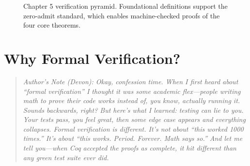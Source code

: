 

\begin{figure}[H]
\centering
{}
\caption{Chapter 5 verification pyramid. Foundational definitions support the zero-admit standard, which enables machine-checked proofs of the four core theorems.}
\label{fig:ch5-roadmap}
\end{figure}

\section{Why Formal Verification?}

\begin{quote}
\textit{Author's Note (Devon): Okay, confession time. When I first heard about ``formal verification'' I thought it was some academic flex---people writing math to prove their code works instead of, you know, actually running it. Sounds backwards, right? But here's what I learned: testing can lie to you. Your tests pass, you feel great, then some edge case appears and everything collapses. Formal verification is different. It's not about ``this worked 1000 times.'' It's about ``this works. Period. Forever. Math says so.'' And let me tell you---when Coq accepted the proofs as complete, it hit different than any green test suite ever did.}
\end{quote}

